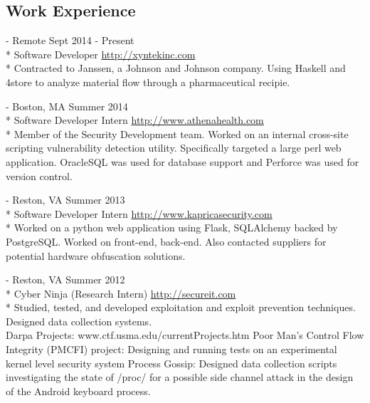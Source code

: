\documentclass[letter,margin,line]{resume}
\newcommand{\rurl}[1]{\hfill {\footnotesize \url{#1}}}
\newcommand{\rdate}[1]{\hfill {\small #1}}
\renewcommand{\employer}[5]{\item[#1] - #2 \rdate{#3} \\* #4 \rurl{#5} \\*}
\begin{document}
\begin{resume}
\section{\mysidestyle Work Experience}
\begin{asparadesc}
\employer{Xyntek Inc.}{Remote}{Sept 2014 - Present}{Software Developer}{http://xyntekinc.com}
Contracted to Janssen, a Johnson and Johnson company. Using Haskell and 4store to analyze material flow through
a pharmaceutical recipie.
\\
\employer{athenahealth}{Boston, MA}{Summer 2014}{Software Developer Intern}{http://www.athenahealth.com}
Member of the Security Development team. Worked on an internal cross-site scripting vulnerability detection utility.
Specifically targeted a large perl web application. OracleSQL was used for database support and Perforce was used for
version control.  
\\
\employer{Kaprica Security}{Reston, VA}{Summer 2013}{Software Developer Intern}{http://www.kapricasecurity.com}
Worked on a python web application using Flask, SQLAlchemy backed by PostgreSQL. Worked on front-end, back-end. Also
contacted suppliers for potential hardware obfuscation solutions.
\\
\employer{SecureIT}{Reston, VA}{Summer 2012}{Cyber Ninja (Research Intern)}{http://secureit.com}
Studied, tested, and developed exploitation and exploit prevention techniques. Designed data collection systems.
\\
	Darpa Projects: \hfill www.ctf.usma.edu/currentProjects.htm
	Poor Man’s Control Flow Integrity (PMCFI) project: Designing and running tests on an experimental kernel level security system
	Process Gossip: Designed data collection scripts investigating the state of /proc/ for a possible side channel attack in the design of the Android keyboard process.
\end{asparadesc}


\end{resume}
\end{document}
